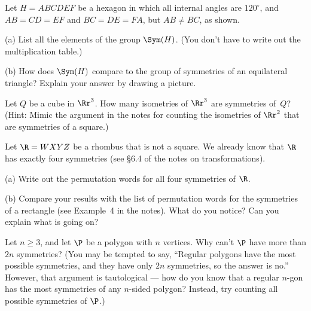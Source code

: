 \bigskip

\begin{TG}
Let $H=ABCDEF$ be a hexagon in which all internal angles are $120^\circ$,
and $AB=CD=EF$ and $BC=DE=FA$, but $AB\neq BC$, as shown.

(a) List all the elements of the group $\Sym(H)$.  (You don't
have to write out the multiplication table.)

(b) How does $\Sym(H)$ compare to the group of symmetries of
an equilateral triangle?  Explain your answer by drawing a picture.
\end{TG}

\bigskip

\begin{TG}
Let $Q$ be a cube in $\Rr^3$.
How many isometries of $\Rr^3$
are symmetries of~$Q$?  (Hint: Mimic the argument
in the notes for counting the isometries of $\Rr^2$
that are symmetries of a square.)
\end{TG}

\bigskip

\begin{TG}
Let $\R=WXYZ$ be a rhombus that is not a square.
We already know that $\R$ has exactly four symmetries
(see \S6.4 of the notes on transformations).

(a) Write out the permutation words for all four symmetries of $\R$.

(b) Compare your results with the list of permutation words for
the symmetries of a rectangle (see Example~4 in the notes).
What do you notice?  Can you explain what is going on?
\end{TG}

\bigskip

\begin{TG}
Let $n\geq 3$, and let $\P$ be a polygon with $n$ vertices.
Why can't $\P$ have more than $2n$ symmetries?
(You may be tempted to say, ``Regular polygons have the most
possible symmetries, and they have only $2n$ symmetries,
so the answer is no.''  However, that argument is tautological ---
how do you know that a regular $n$-gon has the most symmetries
of any $n$-sided polygon?  Instead, try counting all possible symmetries
of $\P$.)
\end{TG}

\bigskip


